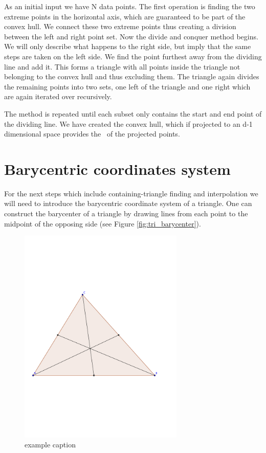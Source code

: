 As an initial input we have N data points. The first operation is finding the two extreme points in the horizontal axis, which are guaranteed to be part of the convex hull. 
We connect these two extreme points thus creating a division between the left and right point set. Now the divide and conquer method begins. We will only describe what happens to the right side, but imply that the same steps are taken on the left side. 
We find the point furthest away from the dividing line and add it. This forms a triangle with all points inside the triangle not belonging to the convex hull and thus excluding them. The triangle again divides the remaining points into two sets, one left of the triangle and one right which are again iterated over recursively. 

The method is repeated until each subset only contains the start and end point of the dividing line. 
We have created the convex hull, which if projected to an d-1 dimensional space provides the \deltri\ of the projected points.



\section{Barycentric coordinates system}

For the next steps which include containing-triangle finding and interpolation we will need to introduce the barycentric coordinate system of a triangle.
One can construct the barycenter of a triangle by drawing lines from each point to the midpoint of the opposing side (see Figure \ref{fig:tri_barycenter}). 


\begin{figure}[htbp] %
   \centering
   \includegraphics[width=0.7\textwidth]{chapter7/plots/barycenter.pdf}
   \caption{example caption}
   \label{fig:example}
\end{figure}


